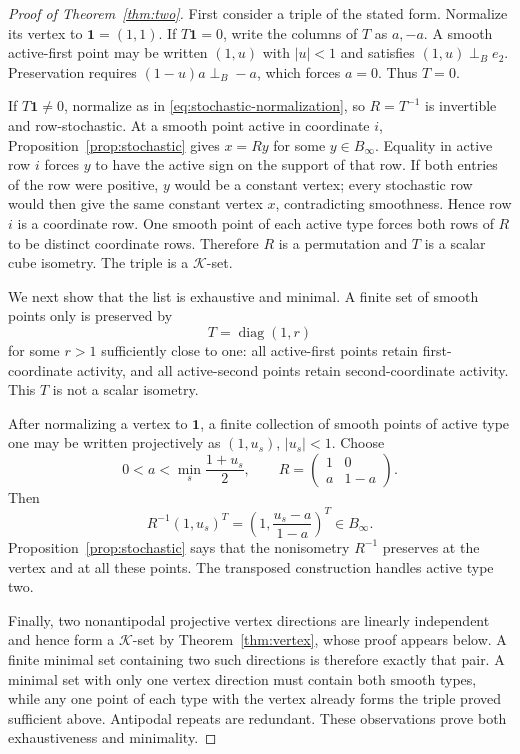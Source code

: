 \documentclass[11pt]{article}
\theoremstyle{definition}
\theoremstyle{remark}
\newcommand{\K}{\mathcal K}
\newcommand{\diag}{\operatorname{diag}}
\newcommand{\one}{\mathbf 1}
\newcommand{\perpB}{\perp_B}
\begin{document}
\begin{proof}[Proof of Theorem~\ref{thm:two}]
First consider a triple of the stated form.  Normalize its vertex to
$\one=(1,1)$.  If $T\one=0$, write the columns of $T$ as $a,-a$.  A smooth
active-first point may be written $(1,u)$ with $|u|<1$ and satisfies
$(1,u)\perpB e_2$.  Preservation requires $(1-u)a\perpB-a$, which forces
$a=0$.  Thus $T=0$.

If $T\one\neq0$, normalize as in \eqref{eq:stochastic-normalization}, so
$R=T^{-1}$ is invertible and row-stochastic.  At a smooth point active in
coordinate $i$, Proposition~\ref{prop:stochastic} gives $x=Ry$ for some
$y\in B_\infty$.  Equality in active row $i$ forces $y$ to have the active
sign on the support of that row.  If both entries of the row were positive,
$y$ would be a constant vertex; every stochastic row would then give the
same constant vertex $x$, contradicting smoothness.  Hence row $i$ is a
coordinate row.  One smooth point of each active type forces both rows of
$R$ to be distinct coordinate rows.  Therefore $R$ is a permutation and
$T$ is a scalar cube isometry.  The triple is a $\K$-set.

We next show that the list is exhaustive and minimal.  A finite set of
smooth points only is preserved by
\[
 T=\diag(1,r)
\]
for some $r>1$ sufficiently close to one: all active-first points retain
first-coordinate activity, and all active-second points retain
second-coordinate activity.  This $T$ is not a scalar isometry.

After normalizing a vertex to $\one$, a finite collection of smooth points
of active type one may be written projectively as $(1,u_s)$, $|u_s|<1$.
Choose
\[
 0<a<\min_s\frac{1+u_s}{2},\qquad
 R=\begin{pmatrix}1&0\\a&1-a\end{pmatrix}.
\]
Then
\[
 R^{-1}(1,u_s)^T=\left(1,\frac{u_s-a}{1-a}\right)^T\in B_\infty.
\]
Proposition~\ref{prop:stochastic} says that the nonisometry $R^{-1}$
preserves at the vertex and at all these points.  The transposed construction
handles active type two.

Finally, two nonantipodal projective vertex directions are linearly
independent and hence form a $\K$-set by Theorem~\ref{thm:vertex}, whose
proof appears below.  A finite minimal set containing two such directions is
therefore exactly that pair.  A minimal set with only one vertex direction
must contain both smooth types, while any one point of each type with the
vertex already forms the triple proved sufficient above.  Antipodal repeats
are redundant.  These observations prove both exhaustiveness and minimality.
\end{proof}
\end{document}
